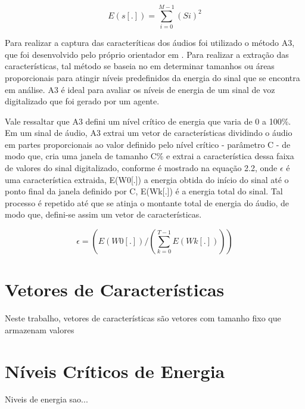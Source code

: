 \documentclass[a4paper,12pt,twoside,openright]{report}
\begin{document}
\begin{equation}
	E(s[.])=\sum_{i = 0}^{M-1} (Si)^2
\end{equation}

\par Para realizar a captura das caracter\'{i}ticas dos \'{a}udios foi utilizado o m\'{e}todo A3, que foi desenvolvido pelo pr\'{o}prio orientador em \cite{Guido_tutorial}. Para realizar a extra{\c c}\~{a}o das caracter\'{i}sticas, tal m\'{e}todo se baseia no em determinar tamanhos ou \'{a}reas proporcionais para atingir n\'{i}veis predefinidos da energia do sinal que se encontra em an\'{a}lise. A3 \'{e} ideal para avaliar os n\'{i}veis de energia de um sinal de voz digitalizado que foi gerado por um agente.
\par Vale ressaltar que A3 defini um n\'{i}vel cr\'{i}tico de energia que varia de 0 a 100{\%}. Em um sinal de \'{a}udio, A3 extrai um vetor de caracter\'{i}sticas dividindo o \'{a}udio em partes proporcionais ao valor definido pelo n\'{i}vel cr\'{i}tico - par\^{a}metro C - de modo que, cria uma janela de tamanho C{\%} e extrai a caracter\'{i}stica dessa faixa de valores do sinal digitalizado, conforme \'{e} mostrado na equa{\c c}\~{a}o 2.2, onde $\epsilon$ \'{e} uma caracter\'{i}stica extraida, E(W0[.]) a energia obtida do in\'{i}cio do sinal at\'{e} o ponto final da janela definido por C, E(Wk[.]) \'{e} a energia total do sinal. Tal processo \'{e} repetido at\'{e} que se atinja o montante total de energia do \'{a}udio, de modo que, defini-se assim um vetor de caracter\'{i}sticas. 

\begin{equation}
	\epsilon = (E(W0[.]) / (\sum_{k = 0}^{T-1}E(Wk[.])))
\end{equation}  



\section{Vetores de Caracter\'{i}sticas}
\label{vetores de caracterisctica}
\par Neste trabalho, vetores de caracter\'{i}sticas s\~{a}o vetores com tamanho fixo que armazenam valores 

\section{N\'{i}veis Cr\'{i}ticos de Energia}
\label{niveis criticos de energia}
\par Niveis de energia sao...
\end{document}
